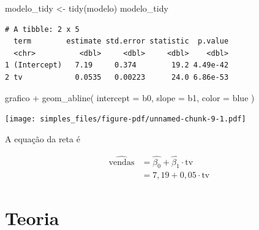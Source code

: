 \documentclass[
  letterpaper,
  DIV=11,
  numbers=noendperiod]{scrreprt}
\newenvironment{Shaded}{\begin{snugshade}}{\end{snugshade}}
\newcommand{\AttributeTok}[1]{\textcolor[rgb]{0.40,0.45,0.13}{#1}}
\newcommand{\DecValTok}[1]{\textcolor[rgb]{0.68,0.00,0.00}{#1}}
\newcommand{\FunctionTok}[1]{\textcolor[rgb]{0.28,0.35,0.67}{#1}}
\newcommand{\NormalTok}[1]{\textcolor[rgb]{0.00,0.23,0.31}{#1}}
\newcommand{\OtherTok}[1]{\textcolor[rgb]{0.00,0.23,0.31}{#1}}
\newcommand{\SpecialCharTok}[1]{\textcolor[rgb]{0.37,0.37,0.37}{#1}}
\newcommand{\StringTok}[1]{\textcolor[rgb]{0.13,0.47,0.30}{#1}}
\begin{document}
\begin{Shaded}
\begin{Highlighting}[]
\NormalTok{modelo\_tidy }\OtherTok{\textless{}{-}} \FunctionTok{tidy}\NormalTok{(modelo)}
\NormalTok{modelo\_tidy}
\end{Highlighting}
\end{Shaded}

\begin{verbatim}
# A tibble: 2 x 5
  term        estimate std.error statistic  p.value
  <chr>          <dbl>     <dbl>     <dbl>    <dbl>
1 (Intercept)   7.19     0.374        19.2 4.49e-42
2 tv            0.0535   0.00223      24.0 6.86e-53
\end{verbatim}

\begin{Shaded}
\end{Shaded}

\begin{Shaded}
\begin{Highlighting}[]
\NormalTok{grafico }\SpecialCharTok{+}
  \FunctionTok{geom\_abline}\NormalTok{(}
    \AttributeTok{intercept =}\NormalTok{ b0,}
    \AttributeTok{slope =}\NormalTok{ b1,}
    \AttributeTok{color =} \StringTok{\textquotesingle{}blue\textquotesingle{}}
\NormalTok{  )}
\end{Highlighting}
\end{Shaded}

\begin{center}
\texttt{[image: simples\_files/figure-pdf/unnamed-chunk-9-1.pdf]}
\end{center}

A equação da reta é

\[
\begin{aligned}
  \widehat{\text{vendas}} 
  &= \hat{\beta_0} + \hat{\beta_1} \cdot \text{tv} \\
  &= 7{,}19 + 0{,}05 \cdot \text{tv}
\end{aligned}
\]

\section{Teoria}\label{teoria}
\end{document}
